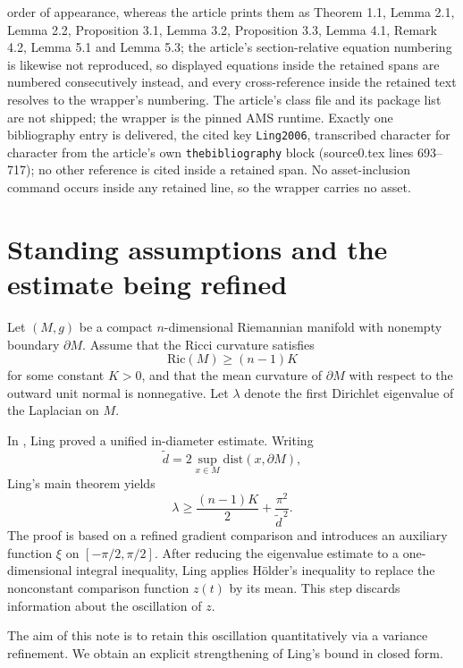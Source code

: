 \documentclass[10pt,a4paper]{amsart}
\newcommand{\Ric}{\mathrm{Ric}}
\newcommand{\de}{\tilde d}
\theoremstyle{plain}
\theoremstyle{remark}
\begin{document}
order of appearance, whereas the article prints them as Theorem 1.1, Lemma 2.1, Lemma 2.2, Proposition 3.1, Lemma 3.2, Proposition 3.3, Lemma 4.1, Remark 4.2, Lemma 5.1 and Lemma 5.3; the article's section-relative equation numbering is likewise not reproduced, so displayed equations inside the retained spans are numbered consecutively instead, and every cross-reference inside the retained text resolves to the wrapper's numbering. The article's class file and its package list are not shipped; the wrapper is the pinned AMS runtime. Exactly one bibliography entry is delivered, the cited key \texttt{Ling2006}, transcribed character for character from the article's own \texttt{thebibliography} block (source0.tex lines 693--717); no other reference is cited inside a retained span. No asset-inclusion command occurs inside any retained line, so the wrapper carries no asset.

\section*{Standing assumptions and the estimate being refined}

Let $(M,g)$ be a compact $n$-dimensional Riemannian manifold with nonempty boundary $\partial M$.
Assume that the Ricci curvature satisfies
\begin{equation}
\label{eq:Ric-lower}
\Ric(M)\ge (n-1)K
\end{equation}
for some constant $K>0$, and that the mean curvature of $\partial M$ with respect to the outward unit normal is nonnegative.
Let $\lambda$ denote the first Dirichlet eigenvalue of the Laplacian on $M$.


In \cite{Ling2006}, Ling proved a unified in-diameter estimate.
Writing
\begin{equation}
\de = 2\sup_{x\in M}\mathrm{dist}(x,\partial M),
\end{equation}
Ling's main theorem yields
\begin{equation}
\lambda \ge \frac{(n-1)K}{2}+\frac{\pi^2}{\de^{\,2}}.
\end{equation}
The proof is based on a refined gradient comparison and introduces an auxiliary function $\xi$ on $[-\pi/2,\pi/2]$.
After reducing the eigenvalue estimate to a one-dimensional integral inequality, Ling applies H\"older's inequality to replace the nonconstant comparison function $z(t)$ by its mean.
This step discards information about the oscillation of $z$.

The aim of this note is to retain this oscillation quantitatively via a variance refinement.
We obtain an explicit strengthening of Ling's bound in closed form.
\end{document}
